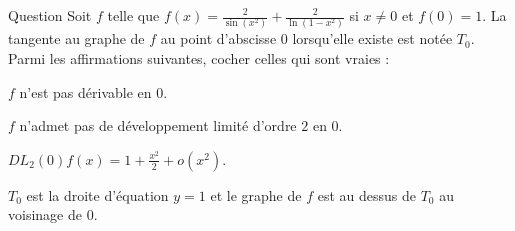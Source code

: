 \begin{multi}[multiple,feedback=
{D'abord, \(\displaystyle f(x)=2\frac{\ln (1-x^2)+\sin (x^2)}{\sin (x^2)\ln (1-x^2)}\), et pour écrire le \(DL_2(0)f(x)\), on utilise les \(DL_6(0)\sin (x^2)\) et \(DL_6(0)\ln(1-x^2)\). On trouve
\[\displaystyle DL_2(0)f(x)=1+\frac{x^2}{2}+o(x^2).\]
Ainsi \(f\) est dérivable en \(0\), \(T_0\) est la droite d'équation \(\displaystyle y=1\) et puisque \(\displaystyle f(x)-y\simeq \frac{x^2}{2}\geq 0\) au voisinage de \(0\) : le graphe de \(f\) est au dessus de \(T_0\) au voisinage de \(0\).
}]{Question}
Soit \(f\) telle que \(\displaystyle f(x)=\frac{2}{\sin (x^2)}+\frac{2}{\ln (1-x^2)}\) si \(x\neq 0\) et \(f(0)=1\). La tangente au graphe de \(f\) au point d'abscisse \(0\) lorsqu'elle existe est notée \(T_0\). Parmi les affirmations suivantes, cocher celles qui sont vraies :

    \item \(f\) n'est pas dérivable en \(0\).
    \item \(f\) n'admet pas de développement limité d'ordre \(2\) en \(0\).
    \item* \(\displaystyle DL_2(0)f(x)=1+\frac{x^2}{2}+o(x^2)\).
    \item* \(T_0\) est la droite d'équation \(\displaystyle y=1\) et le graphe de \(f\) est au dessus de \(T_0\) au voisinage de \(0\).
\end{multi}


